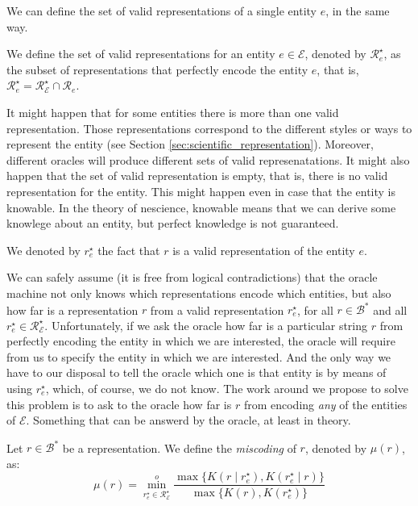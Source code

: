 We can define the set of valid representations of a single entity $e$, in the same way.

\begin{definition}
We define the set of valid representations for an entity $e \in \mathcal{E}$, denoted by $\mathcal{R}^\star_e$, as the subset of representations that perfectly encode the entity $e$, that is, $\mathcal{R}^\star_e = \mathcal{R}^\star_\mathcal{E} \cap \mathcal{R}_e$.
\end{definition}

It might happen that for some entities there is more than one valid representation. Those representations correspond to the different styles or ways to represent the entity (see Section \ref{sec:scientific_representation}). Moreover, different oracles will produce different sets of valid represenatations. It might also happen that the set of valid representation is empty, that is, there is no valid representation for the entity. This might happen even in case that the entity is knowable. In the theory of nescience, knowable means that we can derive some knowlege about an entity, but perfect knowledge is not guaranteed.

\begin{notation}
We denoted by $r^\star_e$ the fact that $r$ is a valid representation of the entity $e$.
\end{notation}

We can safely assume (it is free from logical contradictions) that the oracle machine not only knows which representations encode which entities, but also how far is a representation $r$ from a valid representation $r^\star_e$, for all $r \in \mathcal{B}^\ast$ and all $r^\star_e \in \mathcal{R}^\star_\mathcal{E}$. Unfortunately, if we ask the oracle how far is a particular string $r$ from perfectly encoding the entity in which we are interested, the oracle will require from us to specify the entity in which we are interested. And the only way we have to our disposal to tell the oracle which one is that entity is by means of using $r^\star_e$, which, of course, we do not know. The work around we propose to solve this problem is to ask to the oracle how far is $r$ from encoding \emph{any} of the entities of $\mathcal{E}$. Something that can be answerd by the oracle, at least in theory.

\begin{definition} [Miscoding]
\label{def:miscoding}
Let $r \in \mathcal{B}^\ast$ be a representation. We define the \emph{miscoding} of $r$, denoted by $\mu(r)$, as:
\[
\mu(r) = \overset{o}{ \underset{ r^\star_e \in \mathcal{R}^\star_\mathcal{E} } \min} \frac{ \max\{ K \left( r \mid r^\star_e \right), K \left( r^\star_e \mid r \right) \} } { \max\{ K \left( r \right), K \left( r^\star_e \right) \} }
\]
\end{definition}

